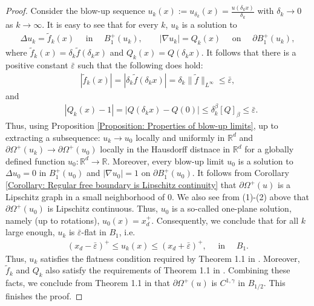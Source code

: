 \documentclass[11pt,reqno]{amsart}
\begin{document}
\begin{proof}
	Consider the blow-up sequence $u_{k}(x):=u_{\delta_{k}}(x)=\frac{u(\delta_{k}x)}{\delta_{k}}$ with $\delta_{k}\to0$ as $k\to\infty$. It is easy to see that for every $k$, $u_{k}$ is a solution to
	\begin{align}\label{Formula: R(9)}
		\Delta u_{k}=\tilde{f}_{k}(x)\quad\text{ in }\quad B_{1}^{+}(u_{k}),\qquad|\nabla u_{k}|=Q_{k}(x)\quad\text{ on }\quad\partial B_{1}^{+}(u_{k}),
	\end{align}
	where $\tilde{f}_{k}(x)=\delta_{k}\tilde{f}(\delta_{k}x)$ and $Q_{k}(x)=Q(\delta_{k}x)$. It follows that there is a positive constant $\bar{\varepsilon}$ such that the following does hold:
	\begin{align*}
		|\tilde{f}_{k}(x)|=|\delta_{k}\tilde{f}(\delta_{k}x)|=\delta_{k}\|\tilde{f}\|_{L^{\infty}}\leqslant\bar{\varepsilon},
	\end{align*}
	and
	\begin{align*}
		&|Q_{k}(x)-1|=|Q(\delta_{k}x)-Q(0)|\leqslant\delta_{k}^{\beta}[Q]_{\beta}\leqslant\bar{\varepsilon}.
	\end{align*}
	Thus, using Proposition \ref{Proposition: Properties of blow-up limits}, up to extracting a subsequence: $u_{k}\to u_{0}$ locally and uniformly in $\mathbb{R}^{d}$ and $\partial\varOmega^{+}(u_{k})\to\partial\varOmega^{+}(u_{0})$ locally in the Hausdorff distnace in $\mathbb{R}^{d}$ for a globally defined function $u_{0}\colon\mathbb{R}^{d}\to\mathbb{R}$. Moreover, every blow-up limit $u_{0}$ is a solution to $\Delta u_{0}=0$ in $B_{1}^{+}(u_{0})$ and $|\nabla u_{0}|=1$ on $\partial B_{1}^{+}(u_{0})$. It follows from Corollary \ref{Corollary: Regular free boundary is Lipschitz continuity} that $\partial\varOmega^{+}(u)$ is a Lipschitz graph in a small neighborhood of $0$. We also see from (1)-(2) above that $\partial\varOmega^{+}(u_{0})$ is Lipschitz continuous. Thus, $u_{0}$ is a so-called one-plane solution, namely (up to rotations), $u_{0}(x)=x_{d}^{+}$. Consequently, we conclude that for all $k$ large enough, $u_{k}$ is $\bar{\varepsilon}$-flat in $B_{1}$, i.e.
	\begin{align*}
		(x_{d}-\bar{\varepsilon})^{+}\leqslant u_{k}(x)\leqslant(x_{d}+\bar{\varepsilon})^{+},\quad\text{ in }\quad B_{1}.
	\end{align*}
	Thus, $u_{k}$ satisfies the flatness condition required by Theorem 1.1 in \cite{S2011}. Moreover, $\tilde{f}_{k}$ and $Q_{k}$ also satisfy the requirements of Theorem 1.1 in  \cite{S2011}. Combining these facts, we conclude from Theorem 1.1 in \cite{S2011} that $\partial\varOmega^{+}(u)$ is $C^{1,\gamma}$ in $B_{1/2}$. This finishes the proof.
\end{proof}
\end{document}
